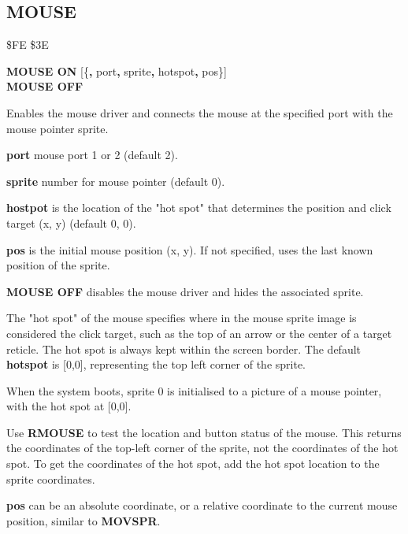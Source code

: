 \subsection{MOUSE}
\begin{description}[leftmargin=2cm,style=nextline]
\item [Token:]    \$FE \$3E

\item [Format:]   {\bf MOUSE ON} [\{{\bf,} port{\bf,} sprite{\bf,} hotspot{\bf,} pos\}] \\
                  {\bf MOUSE OFF}

\item [Usage:]    Enables the mouse driver and connects the mouse at the specified port with the mouse pointer sprite.

                  {\bf port} mouse port 1 or 2 (default 2).

                  {\bf sprite} number for mouse pointer (default 0).

                  {\bf hostpot} is the location of the "hot spot" that determines the position and click target (x, y) (default 0, 0).

                  {\bf pos} is the initial mouse position (x, y). If not specified, uses the last known position of the sprite.

                  {\bf MOUSE OFF} disables the mouse driver and hides the associated sprite.

\item [Remarks:]  The "hot spot" of the mouse specifies where in the mouse sprite image is considered the click target, such as the top of an arrow or the center of a target reticle. The hot spot is always kept within the screen border. The default {\bf hotspot} is [0,0], representing the top left corner of the sprite.

                  When the system boots, sprite 0 is initialised to a picture of a mouse pointer, with the hot spot at [0,0].

                  Use {\bf RMOUSE} to test the location and button status of the mouse. This returns the coordinates of the top-left corner of the sprite, not the coordinates of the hot spot. To get the coordinates of the hot spot, add the hot spot location to the sprite coordinates.

                  {\bf pos} can be an absolute coordinate, or a relative coordinate to the current mouse position, similar to {\bf MOVSPR}.


\end{description}
